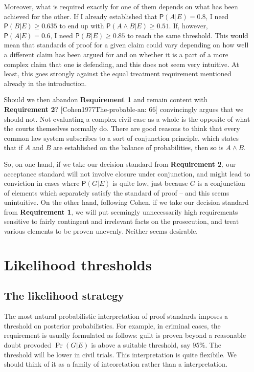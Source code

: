 \documentclass[10pt,dvipsnames,enabledeprecatedfontcommands]{scrartcl}
\newcommand{\et}{\wedge}
\newcommand{\pr}[1]{\mathsf{P}(#1)}
\begin{document}
Moreover, what is required exactly for one of them depends on what has
been achieved for the other. If I already established that
\(\pr{A\vert E}=0.8\), I need \(\pr{B\vert E}\geq 0.635\) to end up with
\(\pr{A\et B\vert E}\geq 0.51\). If, however, \(\pr{A\vert E}=0.6\), I
need \(\pr{B\vert E}\geq 0.85\) to reach the same threshold. This would
mean that standards of proof for a given claim could vary depending on
how well a different claim has been argued for and on whether it is a
part of a more complex claim that one is defending, and this does not
seem very intuitive. At least, this goes strongly against the equal
treatment requirement mentioned already in the introduction.

Should we then abandon \textbf{Requirement 1} and remain content with
\textbf{Requirement 2}? {[}Cohen1977The-probable-an: 66{]} convincingly
argues that we should not. Not evaluating a complex civil case as a
whole is the opposite of what the courts themselves normally do. There
are good reasons to think that every common law system subscribes to a
sort of conjunction principle, which states that if \(A\) and \(B\) are
established on the balance of probabilities, then so is \(A\et B\).

So, on one hand, if we take our decision standard from
\textbf{Requirement 2}, our acceptance standard will not involve closure
under conjunction, and might lead to conviction in cases where
\(\pr{G\vert E}\) is quite low, just because \(G\) is a conjunction of
elements which separately satisfy the standard of proof -- and this
seems unintuitive. On the other hand, following Cohen, if we take our
decision standard from \textbf{Requirement 1}, we will put seemingly
unnecessarily high requirements sensitive to fairly contingent and
irrelevant facts on the prosecution, and treat various elements to be
proven unevenly. Neither seems desirable.

\section{Likelihood thresholds}\label{likelihood-thresholds}

\subsection{The likelihood strategy}\label{the-likelihood-strategy}

The most natural probabilistic interpretation of proof standards imposes
a threshold on posterior probabilisties. For example, in criminal cases,
the requirement is usually formulated as follows: guilt is proven beyond
a reasonable doubt provoded \(\Pr(G | E)\) is above a suitable
threshold, say 95\%. The threshold will be lower in civil trials. This
interpretation is quite flexibile. We should think of it as a family of
inteoretation rather than a interpretation.
\end{document}
